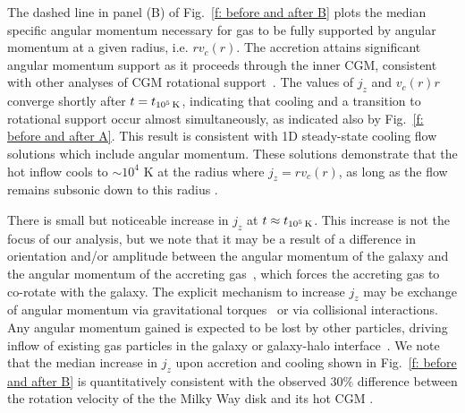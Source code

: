 \documentclass[fleqn,usenatbib]{mnras}
\newcommand{\tcools}{t_{10^5\,{\rm K}}}
\begin{document}
The dashed line in panel (B) of Fig.~\ref{f: before and after B} plots the median specific angular momentum necessary for gas to be fully supported by angular momentum at a given radius, i.e. $rv_c(r)$.
The accretion attains significant angular momentum support as it proceeds through the inner CGM, consistent with other analyses of CGM rotational support~\citep{Oppenheimer2018, Trapp2021}.
The values of $j_z$ and $v_c(r)r$ converge shortly after $t=\tcools$, indicating that cooling and a transition to rotational support occur almost simultaneously, as indicated also by Fig.~\ref{f: before and after A}.
This result is consistent with 1D steady-state cooling flow solutions which include angular momentum.
These solutions demonstrate that the hot inflow cools to $\sim10^4$ K at the radius where $j_z=r v_c(r)$, as long as the flow remains subsonic down to this radius \citep{Cowie1980, Stern2019}.

There is small but noticeable increase in $j_z$ at $t \approx \tcools$.
This increase is not the focus of our analysis, but we note that it may be a result of a difference in orientation and/or amplitude between the angular momentum of the galaxy and the angular momentum of the accreting gas~\citep[e.g.][]{Danovich2012, DeFelippis2017}, which forces the accreting gas to co-rotate with the galaxy.
The explicit mechanism to increase $j_z$ may be exchange of angular momentum via gravitational torques~\citep[e.g.][]{Danovich2015, Angles-Alcazar2021} or via collisional interactions.
Any angular momentum gained is expected to be lost by other particles, driving inflow of existing gas particles in the galaxy or galaxy-halo interface~\citep[e.g.][]{Mayor1981, Pezzulli2017}.
We note that the median increase in $j_z$ upon accretion and cooling shown in Fig.~\ref{f: before and after B} is quantitatively consistent with the observed $30\%$ difference between the rotation velocity of the the Milky Way disk and its hot CGM \citep{Hodges-Kluck2016}.

\end{document}
